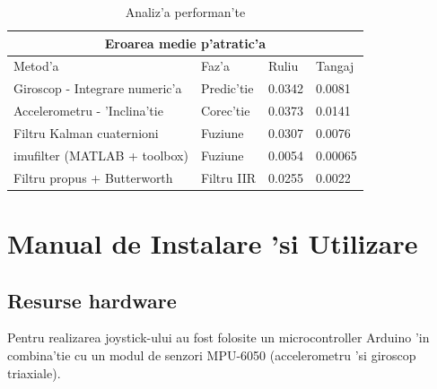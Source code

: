 \documentclass[12pt,a4paper,twoside]{report}
\begin{document}
\begin{table}[ht]
\centering
\begin{tabular}{ |p{6cm}||p{2cm}|p{2cm}|p{2cm}|  }
 \hline
 \multicolumn{4}{|c|}{Eroarea medie p'atratic'a} \\
 \hline
 Metod'a & Faz'a & Ruliu & Tangaj\\
 \hline
 Giroscop - Integrare numeric'a   & Predic'tie    &0.0342&   0.0081\\
 Accelerometru - 'Inclina'tie &  Corec'tie & 0.0373   & 0.0141\\
 Filtru Kalman cuaternioni & Fuziune & 0.0307 &  0.0076\\
 imufilter (MATLAB + toolbox)    & Fuziune & 0.0054&  0.00065\\
 Filtru propus + Butterworth &  Filtru IIR  & 0.0255 & 0.0022\\
 \hline
\end{tabular}
\caption{Analiz'a performan'te}
\label{tab:my_label}
\end{table}


\chapter{Manual de Instalare 'si Utilizare}



\section{Resurse hardware}

Pentru realizarea joystick-ului au fost folosite un microcontroller Arduino 'in combina'tie cu un modul de senzori MPU-6050 (accelerometru 'si giroscop triaxiale). 
\end{document}
